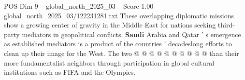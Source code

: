 \begin{textsample}{POS Dim 9 – global\_north\_2025\_03 – Score 1.00 – global\_north\_2025\_03/122231281.txt}
These overlapping diplomatic missions show a growing center of gravity in the Middle East for nations seeking third-party mediators in geopolitical conflicts. \textbf{Saudi} Arabia and Qatar ' s emergence as established mediators is a product of the countries ' decadeslong efforts to clean up their image for the West.
The two @ @ @ @ @ @ @ @ @ @ than their more fundamentalist neighbors through participation in global cultural institutions such as FIFA and the Olympics.

\end{textsample}
